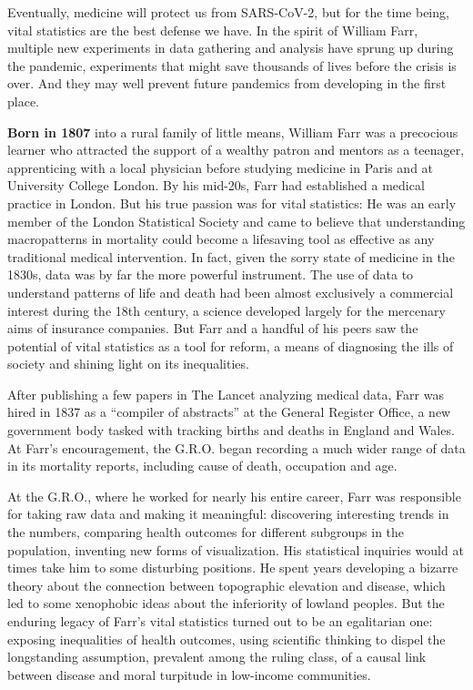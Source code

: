 Eventually, medicine will protect us from SARS-CoV-2, but for the time
being, vital statistics are the best defense we have. In the spirit of
William Farr, multiple new experiments in data gathering and analysis
have sprung up during the pandemic, experiments that might save
thousands of lives before the crisis is over. And they may well prevent
future pandemics from developing in the first place.

\textbf{Born in 1807} into a rural family of little means, William Farr
was a precocious learner who attracted the support of a wealthy patron
and mentors as a teenager, apprenticing with a local physician before
studying medicine in Paris and at University College London. By his
mid-20s, Farr had established a medical practice in London. But his true
passion was for vital statistics: He was an early member of the London
Statistical Society and came to believe that understanding macropatterns
in mortality could become a lifesaving tool as effective as any
traditional medical intervention. In fact, given the sorry state of
medicine in the 1830s, data was by far the more powerful instrument. The
use of data to understand patterns of life and death had been almost
exclusively a commercial interest during the 18th century, a science
developed largely for the mercenary aims of insurance companies. But
Farr and a handful of his peers saw the potential of vital statistics as
a tool for reform, a means of diagnosing the ills of society and shining
light on its inequalities.

After publishing a few papers in The Lancet analyzing medical data, Farr
was hired in 1837 as a ``compiler of abstracts'' at the General Register
Office, a new government body tasked with tracking births and deaths in
England and Wales. At Farr's encouragement, the G.R.O. began recording a
much wider range of data in its mortality reports, including cause of
death, occupation and age.

At the G.R.O., where he worked for nearly his entire career, Farr was
responsible for taking raw data and making it meaningful: discovering
interesting trends in the numbers, comparing health outcomes for
different subgroups in the population, inventing new forms of
visualization. His statistical inquiries would at times take him to some
disturbing positions. He spent years developing a bizarre theory about
the connection between topographic elevation and disease, which led to
some xenophobic ideas about the inferiority of lowland peoples. But the
enduring legacy of Farr's vital statistics turned out to be an
egalitarian one: exposing inequalities of health outcomes, using
scientific thinking to dispel the longstanding assumption, prevalent
among the ruling class, of a causal link between disease and moral
turpitude in low-income communities.

